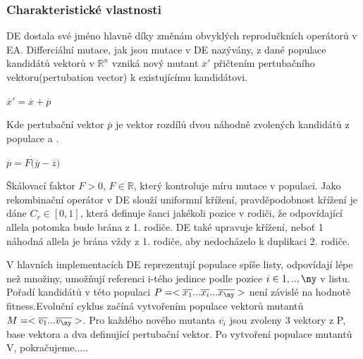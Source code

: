 \subsubsection{Charakteristické vlastnosti}
DE dostala své jméno hlavně díky změnám obvyklých reprodučkních operátorů v EA. Differciální mutace, jak jsou mutace v DE nazývány, z dané populace kandidátů vektorů v $\mathbb{R}^n$ vzniká nový mutant $\overline{x}'$ přičtením pertubačního vektoru(pertubation vector) k existujícímu kandidátovi. \par
$\overline{x}'=\overline{x}+\overline{p}$ \par
Kde pertubační vektor $\overline{p}$ je vektor rozdílů dvou náhodně zvolených kandidátů z populace  a . \par 
$\overline{p}=F\dot(\overline{y}-\overline{z})$ \par
Škálovací faktor $F>0$, $F \in \mathbb{R}$, který kontroluje míru mutace v populaci. Jako rekombinační operátor v DE slouží uniformní křížení, pravděpodobnost křížení je dáne $C_r \in [0,1]$, která definuje šanci jakékoli pozice v rodiči, že odpovídající allela potomka bude brána z 1. rodiče. DE také upravuje křížení, neboť 1 náhodná allela je brána vždy z 1. rodiče, aby nedocházelo k duplikaci 2. rodiče. \par 
V hlavních implementacích DE reprezentují populace spíše listy, odpovídají lépe než množiny, umožňují referenci i-tého jedince podle pozice $i\in{1,..,\ny}$ v listu. Pořadí kandidátů v této populaci $P=<\overline{x_1}...\overline{x_i}...\overline{x_{\ny}}>$ není závislé na hodnotě fitness.Evoluční cyklus začíná vytvořením populace vektorů mutantů $M=<\overline{v_1}...\overline{v_{\ny}}>$. Pro každého nového mutanta $\overline{v_i}$ jsou zvoleny 3 vektory z P, base vektora a dva definující pertubační vektor. Po vytvoření populace mutantů V, pokračujeme..... 